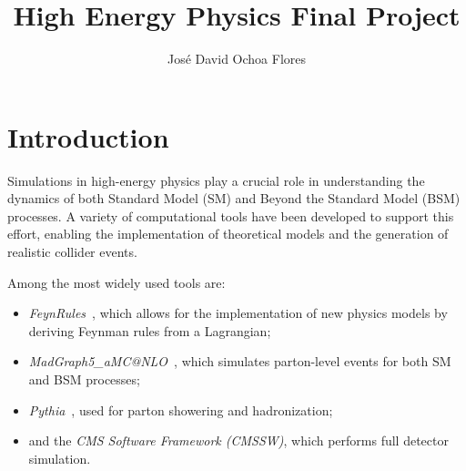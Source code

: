 \documentclass{CUP-JNL-DTM}%
\theoremstyle{definition}
\numberwithin{equation}{section}
\begin{document}
\begin{Frontmatter}

\title[Article Title]{High Energy Physics Final Project}

\author[1]{Jos\'e David Ochoa Flores}


\address[1]{, , }





\end{Frontmatter}


\section{Introduction}
Simulations in high-energy physics play a crucial role in understanding the dynamics of both Standard Model (SM) and Beyond the Standard Model (BSM) processes. A variety of computational tools have been developed to support this effort, enabling the implementation of theoretical models and the generation of realistic collider events.

Among the most widely used tools are:
\begin{itemize}
    \item \textit{FeynRules}~\cite{Alloul:2013bka}, which allows for the implementation of new physics models by deriving Feynman rules from a Lagrangian;
    \item \textit{MadGraph5\_aMC@NLO}~\cite{Alwall:2014hca}, which simulates parton-level events for both SM and BSM processes;
    \item \textit{Pythia}~\cite{Sjostrand:2014zea}, used for parton showering and hadronization;
    \item and the \textit{CMS Software Framework (CMSSW)}, which performs full detector simulation.
\end{itemize}
\end{document}

